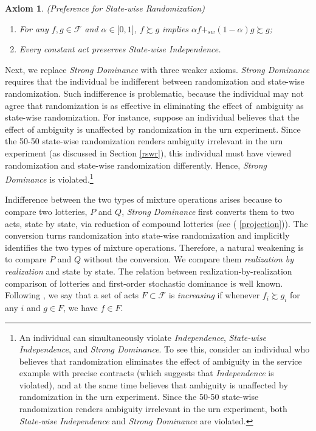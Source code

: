 \documentclass[12pt, notitlepage]{article}
\newtheorem{axiom}{Axiom}
\begin{document}
\begin{axiom}
(Preference for State-wise Randomization)

\begin{enumerate}
\item[(i)] For any $f,g\in \mathcal{F}$ and $\alpha \in \lbrack 0,1]$, $%
f\succsim g$ implies $\alpha f+_{sw}(1-\alpha )g\succsim g$;

\item[(ii)] Every constant act preserves State-wise Independence.
\end{enumerate}
\end{axiom}

Next, we replace \textit{Strong Dominance} with three weaker axioms. \textit{%
Strong Dominance} requires that the individual be indifferent between
randomization and state-wise randomization. Such indifference is
problematic, because the individual may not agree that randomization is as
effective in eliminating the effect of\ ambiguity as state-wise
randomization. For instance, suppose an individual believes that the effect
of ambiguity is unaffected by randomization in the urn experiment. Since the
50-50 state-wise randomization renders ambiguity irrelevant in the urn
experiment (as discussed in Section \ref{rswr}), this individual must have
viewed randomization and state-wise randomization differently. Hence, 
\textit{Strong Dominance} is violated.\footnote{%
An individual can simultaneously violate \textit{Independence}, \textit{%
State-wise Independence}, and \textit{Strong Dominance}. To see this,
consider an individual who believes that randomization eliminates the effect
of ambiguity in the service example with precise contracts (which suggests
that \textit{Independence} is violated), and at the same time believes that
ambiguity is unaffected by randomization in the urn experiment. Since the
50-50 state-wise randomization renders ambiguity irrelevant in the urn
experiment, both \textit{State-wise Independence} and \textit{Strong
Dominance} are violated.}

Indifference between the two types of mixture operations arises because to
compare two lotteries, $P$ and $Q$, \textit{Strong Dominance} first converts
them to two acts, state by state, via reduction of compound lotteries (see (%
\ref{projection})). The conversion turns randomization into state-wise
randomization and implicitly identifies the two types of mixture operations.
Therefore, a natural weakening is to compare $P$ and $Q$ without the
conversion. We compare them \textit{realization by realization} and state by
state. The relation between realization-by-realization comparison of
lotteries and first-order stochastic dominance is well known. Following \cite%
{Lehmann55}, we say that a set of acts $F\subset \mathcal{F}$ is \textit{%
increasing} if whenever $f_{i}\succsim g_{i}$ for any $i$ and $g\in F$, we
have $f\in F$.
\end{document}
